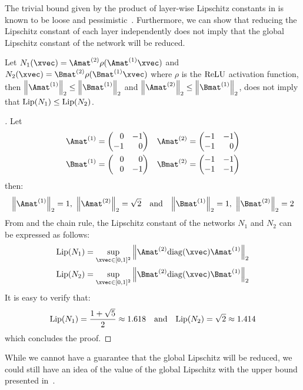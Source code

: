 The trivial bound given by the product of layer-wise Lipschitz constants in  is known to be loose and pessimistic~\citet{combettes2019lipschitz}.
Furthermore, we can show that reducing the Lipschitz constant of each layer independently does not imply that the global Lipschitz constant of the network will be reduced. 
\begin{proposition} \label{proposition:ch3-limit_bound_lipschitz}
  Let $N_1(\xvec) = \Amat^{(2)} \rho(\Amat^{(1)} \xvec)$ and $N_2(\xvec) = \Bmat^{(2)} \rho(\Bmat^{(1)} \xvec)$ where $\rho$ is the $\mathrm{ReLU}$ activation function, then $\norm{\Amat^{(1)}}_2 \leq \norm{\Bmat^{(1)}}_2$ and $\norm{\Amat^{(2)}}_2 \leq \norm{\Bmat^{(1)}}_2$, does not imply that $\lip{N_1} \leq \lip{N_2}$.
\end{proposition}
\begin{proof}[]
  Let
  \begin{align*}
    \Amat^{(1)} &= \leftmatrix 
      \phantom{+}0 & -1 \\ -1 & \phantom{+}0
    \rightmatrix \quad
    \Amat^{(2)}  = \leftmatrix
      -1 & -1 \\ -1 & \phantom{+}0
    \rightmatrix \\
    \Bmat^{(1)} &= \leftmatrix
      \phantom{+}0 & \phantom{+}0 \\ \phantom{+}0 & -1
    \rightmatrix \quad
    \Bmat^{(2)} = \leftmatrix
      -1 & -1 \\ -1 & -1
    \rightmatrix
  \end{align*}
  then: \vspace{-0.5cm}
  \begin{equation*}
    \norm{\Amat^{(1)}}_2 = 1,\ \norm{\Amat^{(2)}}_2 = \sqrt{2}
    \quad \text{and} \quad
    \norm{\Bmat^{(1)}}_2 = 1,\ \norm{\Bmat^{(2)}}_2 = 2
  \end{equation*}
  From  and the chain rule, the Lipschitz constant of the networks $N_1$ and $N_2$ can be expressed as follows:
  \begin{align*}
    \lip{N_1} &= \sup_{\xvec \in [0, 1]^2} \norm{\Amat^{(2)} \diag\left(\xvec\right) \Amat^{(1)}}_2 \\
    \lip{N_2} &= \sup_{\xvec \in [0, 1]^2} \norm{\Bmat^{(2)} \diag\left(\xvec\right) \Bmat^{(1)}}_2
  \end{align*}
  It is easy to verify that:
  \begin{equation*}
    \lip{N_1} = \frac{1 + \sqrt{5}}{2} \approx 1.618 \quad \text{and} \quad \lip{N_2} = \sqrt{2} \approx 1.414
  \end{equation*}
  which concludes the proof.
\end{proof}
\noindent
While we cannot have a guarantee that the global Lipschitz will be reduced, we could still have an idea of the value of the global Lipschitz with the upper bound presented in~.


